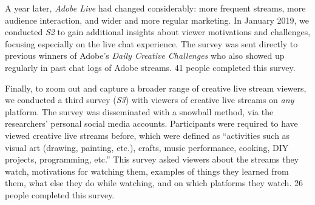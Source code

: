 A year later, \textit{Adobe Live} had changed considerably: more frequent streams, more audience interaction, and wider and more regular marketing. In January 2019, we conducted \textit{S2} to gain additional insights about viewer motivations and challenges, focusing especially on the live chat experience. The survey was sent directly to previous winners of Adobe's \textit{Daily Creative Challenges} who also showed up regularly in past chat logs of Adobe streams. 41 people completed this survey.

Finally, to zoom out and capture a broader range of creative live stream viewers, we conducted a third survey (\textit{S3}) with viewers of creative live streams on \textit{any}  platform. The survey was disseminated with a snowball method, via the researchers' personal social media accounts. Participants were required to have viewed creative live streams before, which were defined as ``activities such as visual art (drawing, painting, etc.), crafts, music performance, cooking, DIY projects, programming, etc.'' This survey asked viewers about the streams they watch, motivations for watching them, examples of things they learned from them, what else they do while watching, and on which platforms they watch. 26 people completed this survey.

